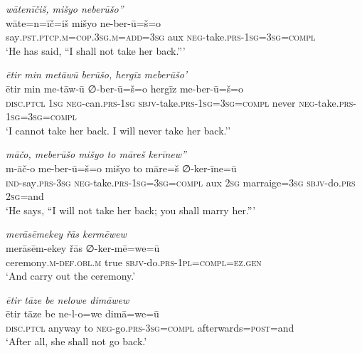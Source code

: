 \ea \label{ZP.108}
\textit{wātenīčiš, mišyo neberūšo”} \\ 
\gll wāte=n=īč=iš mišyo ne-ber-ū=š=o \\ 
 say\textsc{.pst}\textsc{.ptcp}\textsc{.m}\textsc{=cop}\textsc{.3sg}\textsc{.m}\textsc{=add}\textsc{=3sg} aux \textsc{neg-}take\textsc{.prs}\textsc{-\textsc{1sg}}\textsc{=3sg}\textsc{=compl} \\ 
\glt `He has said, “I shall not take her back.”'
\z 
 
\ea \label{ZP.109}
\textit{ētir min metāwū berūšo, hergīz meberūšo’} \\ 
\gll ētir min me-tāw-ū ∅-ber-ū=š=o hergīz me-ber-ū=š=o \\ 
 \textsc{disc.ptcl} \textsc{1sg} \textsc{neg-}can\textsc{.prs}\textsc{-\textsc{1sg}} \textsc{sbjv-}take\textsc{.prs}\textsc{-\textsc{1sg}}\textsc{=3sg}\textsc{=compl} never \textsc{neg-}take\textsc{.prs}\textsc{-\textsc{1sg}}\textsc{=3sg}\textsc{=compl} \\ 
\glt `I cannot take her back. I will never take her back.’'
\z 
 
\ea \label{ZP.116}
\textit{māčo, meberūšo mišyo to māreš kerīnew”} \\ 
\gll m-āč-o me-ber-ū=š=o mišyo to māre=š ∅-ker-īne=ū \\ 
 \textsc{ind-}say\textsc{.prs}\textsc{-3sg} \textsc{neg-}take\textsc{.prs}\textsc{-\textsc{1sg}}\textsc{=3sg}\textsc{=compl} aux \textsc{2sg} marraige\textsc{=3sg} \textsc{sbjv-}do\textsc{.prs} \textsc{2sg}=and \\ 
\glt `He says, “I will not take her back; you shall marry her.”'
\z 
 
\ea \label{ZP.123}
\textit{merāsēmekey řās kermēwew} \\ 
\gll merāsēm-ekey řās ∅-ker-mē=we=ū \\ 
 ceremony\textsc{.m}\textsc{-def}\textsc{.obl}\textsc{.m} true \textsc{sbjv-}do\textsc{.prs}\textsc{-1pl}\textsc{=compl}\textsc{\textsc{=ez.gen}} \\ 
\glt `And carry out the ceremony.'
\z 
 
\ea \label{ZP.124}
\textit{ētir tāze be nelowe dimāwew} \\ 
\gll ētir tāze be ne-l-o=we dimā=we=ū \\ 
 \textsc{disc.ptcl} anyway to \textsc{neg-}go\textsc{.prs}\textsc{-3sg}\textsc{=compl} afterwards\textsc{=\textsc{post}}=and \\ 
\glt `After all, she shall not go back.'
\z 
 
